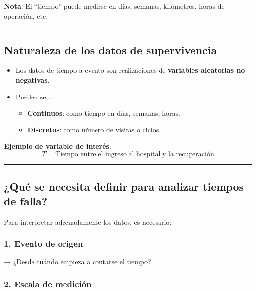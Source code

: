 \documentclass[
  letterpaper,
  DIV=11,
  numbers=noendperiod]{scrartcl}
\providecommand{\tightlist}{%
  \setlength{\itemsep}{0pt}\setlength{\parskip}{0pt}}
\begin{document}
\textbf{Nota}: El ``tiempo'' puede medirse en días, semanas, kilómetros,
horas de operación, etc.

\begin{center}\rule{0.5\linewidth}{0.5pt}\end{center}

\subsection{Naturaleza de los datos de
supervivencia}\label{naturaleza-de-los-datos-de-supervivencia}

\begin{itemize}
\tightlist
\item
  Los datos de tiempo a evento son realizaciones de \textbf{variables
  aleatorias no negativas}.
\item
  Pueden ser:

  \begin{itemize}
  \tightlist
  \item
    \textbf{Continuos}: como tiempo en días, semanas, horas.
  \item
    \textbf{Discretos}: como número de visitas o ciclos.
  \end{itemize}
\end{itemize}

\textbf{Ejemplo de variable de interés}:\\
\[
T = \text{Tiempo entre el ingreso al hospital y la recuperación}
\]

\begin{center}\rule{0.5\linewidth}{0.5pt}\end{center}

\subsection{¿Qué se necesita definir para analizar tiempos de
falla?}\label{quuxe9-se-necesita-definir-para-analizar-tiempos-de-falla}

Para interpretar adecuadamente los datos, es necesario:

\subsubsection{1. Evento de origen}\label{evento-de-origen}

→ ¿Desde cuándo empieza a contarse el tiempo?

\subsubsection{2. Escala de medición}\label{escala-de-mediciuxf3n}
\end{document}
